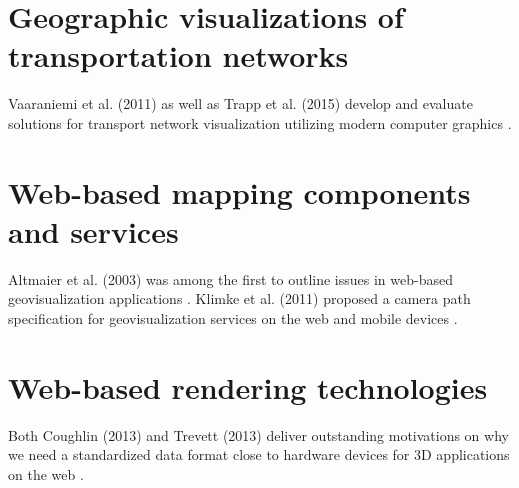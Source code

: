   \section{Geographic visualizations of transportation networks}
    \label{sec:overv:geovs}
    Vaaraniemi et al. (2011) as well as Trapp et al. (2015) develop and evaluate solutions for transport network visualization utilizing modern computer graphics \cite{Vaaraniemi2011}\cite{Trapp2015}.\par
  \section{Web-based mapping components and services}
    \label{sec:overv:webmp}
    Altmaier et al. (2003) was among the first to outline issues in web-based geovisualization applications \cite{Altmaier2003}. Klimke et al. (2011) proposed a camera path specification for geovisualization services on the web and mobile devices \cite{klimke2013service}.\par
  \section{Web-based rendering technologies}
    \label{sec:overv:webrn}
    Both Coughlin (2013) and Trevett (2013) deliver outstanding motivations on why we need a standardized data format close to hardware devices for 3D applications on the web \cite{Coughlin2014}\cite{Trevett2012}.\par
